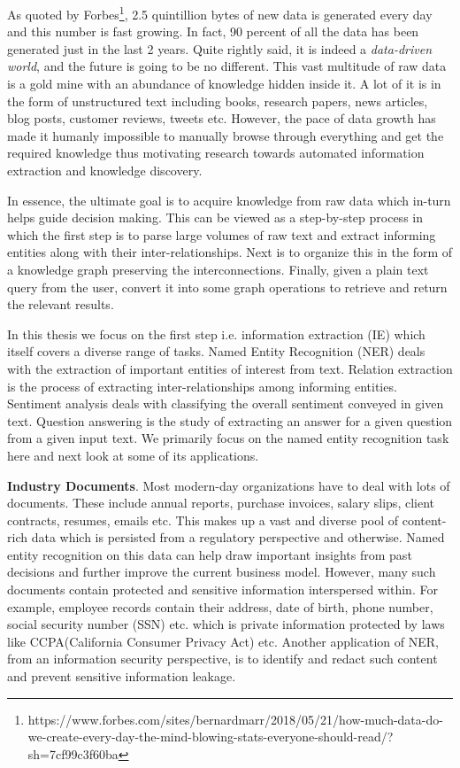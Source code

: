 As quoted by Forbes\footnote{https://www.forbes.com/sites/bernardmarr/2018/05/21/how-much-data-do-we-create-every-day-the-mind-blowing-stats-everyone-should-read/?sh=7cf99c3f60ba}, 2.5 quintillion bytes of new data is generated every day and this number is fast growing. In fact, 90 percent of all the data has been generated just in the last 2 years. Quite rightly said, it is indeed a \textit{data-driven world}, and the future is going to be no different. This vast multitude of raw data is a gold mine with an abundance of knowledge hidden inside it. A lot of it is in the form of unstructured text including books, research papers, news articles, blog posts, customer reviews, tweets etc. However, the pace of data growth has made it humanly impossible to manually browse through everything and get the required knowledge thus motivating research towards automated information extraction and knowledge discovery. 

In essence, the ultimate goal is to acquire knowledge from raw data which in-turn helps guide decision making. This can be viewed as a step-by-step process in which the  first step is to parse large volumes of raw text and extract informing entities along with their inter-relationships. Next is to organize this in the form of a knowledge graph preserving the interconnections. Finally, given a plain text query from the user, convert it into some graph operations to retrieve and return the relevant results.

In this thesis we focus on the first step i.e. information extraction (IE) which itself covers a diverse range of tasks. Named Entity Recognition (NER) deals with the extraction of important entities of interest from text. Relation extraction is the process of extracting inter-relationships among informing entities. Sentiment analysis deals with classifying the overall sentiment conveyed in given text. Question answering is the study of extracting an answer for a given question from a given input text. We primarily focus on the named entity recognition task here and next look at some of its applications.

\textbf{Industry Documents}. Most modern-day organizations have to deal with lots of documents. These include annual reports, purchase invoices, salary slips, client contracts, resumes, emails etc. This makes up a vast and diverse pool of content-rich data which is persisted from a regulatory perspective and otherwise. Named entity recognition on this data can help draw important insights from past decisions and further improve the current business model. However, many such documents contain protected and sensitive information interspersed within. For example, employee records contain their address, date of birth, phone number, social security number (SSN) etc. which is private information protected by laws like CCPA(California Consumer Privacy Act) etc. Another application of NER, from an information security perspective, is to identify and redact such content and prevent sensitive information leakage.

